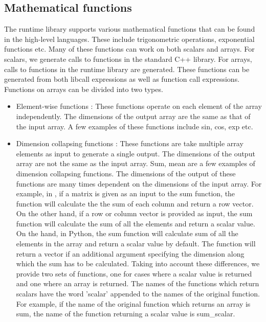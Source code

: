 \subsection{Mathematical functions} 
The runtime library supports various mathematical functions that can be found in the high-level languages. These include trigonometric operations, exponential functions etc. Many of these functions can work on both scalars and arrays. For scalars, we generate calls to functions in the standard C++ library. For arrays, calls to functions in the runtime library are generated. These functions can be generated from both libcall expressions as well as function call expressions.  Functions on arrays can be divided into two types.
\begin{itemize}
\item Element-wise functions : These functions operate on each element of the array independently. The dimensions of the output array are the same as that of the input array. A few examples of these functions include sin, cos, exp etc. 
\item Dimension collapsing functions : These functions are take multiple array elements as input to generate a single output. The dimensions of the output array are not the same as the input array. Sum, mean are a few examples of dimension collapsing functions. The dimensions of the output of these functions are many times dependent on the dimensions of the input array. For example, in \matlab, if a matrix is given as an input to the sum function, the function will calculate the the sum of each column and return a row vector. On the other hand, if a row or column vector is provided as input, the sum function will calculate the sum of all the elements and return a scalar value. On the hand, in Python, the sum function will calculate sum of all the elements in the array and return a scalar value by default. The function will return a vector if an additional argument specifying the dimension along which the sum has to be calculated. Taking into account these differences, we provide two sets of functions, one for cases where a scalar value is returned and one where an array is returned. The names of the functions which return scalars have the word 'scalar' appended to the names of the original function. For example, if the name of the original function  which returns an array is sum, the name of the function returning a scalar value is sum\_scalar.
\end{itemize}
